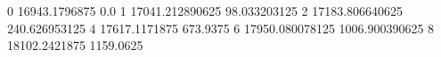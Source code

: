 0 16943.1796875 0.0
1 17041.212890625 98.033203125
2 17183.806640625 240.626953125
4 17617.1171875 673.9375
6 17950.080078125 1006.900390625
8 18102.2421875 1159.0625
